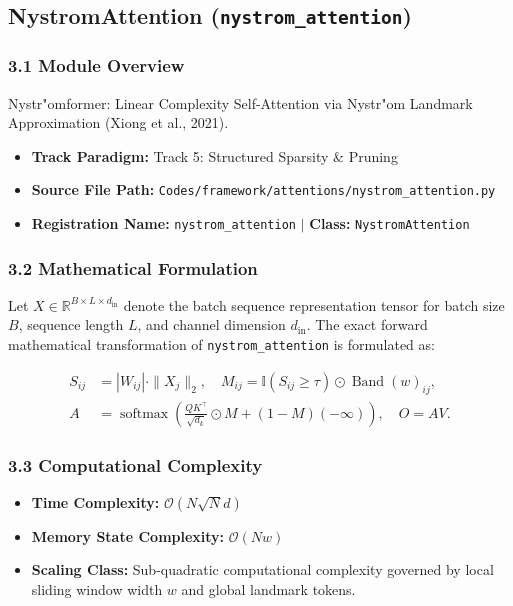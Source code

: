 \subsection{NystromAttention (\texttt{nystrom\_attention})}
\label{sec:app_module_nystrom_attention}

\subsubsection*{3.1 Module Overview}
Nystr"{o}mformer: Linear Complexity Self-Attention via Nystr"{o}m Landmark Approximation (Xiong et al., 2021).
\begin{itemize}
    \item \textbf{Track Paradigm:} Track 5: Structured Sparsity \& Pruning
    \item \textbf{Source File Path:} \texttt{Codes/framework/attentions/nystrom\_attention.py}
    \item \textbf{Registration Name:} \texttt{nystrom\_attention} $\mid$ \textbf{Class:} \texttt{NystromAttention}
\end{itemize}

\subsubsection*{3.2 Mathematical Formulation}
Let $X \in \mathbb{R}^{B \times L \times d_{\text{in}}}$ denote the batch sequence representation tensor for batch size $B$, sequence length $L$, and channel dimension $d_{\text{in}}$. The exact forward mathematical transformation of \texttt{nystrom\_attention} is formulated as:

\begin{align}
S_{ij} &= |W_{ij}| \cdot \|X_j\|_2, \quad M_{ij} = \mathbb{I}(S_{ij} \ge \tau) \odot \operatorname{Band}(w)_{ij}, \\
A &= \operatorname{softmax}\left(\frac{Q K^\top}{\sqrt{d_k}} \odot M + (1 - M)(-\infty)\right), \quad O = A V.
\end{align}


\subsubsection*{3.3 Computational Complexity}
\begin{itemize}
    \item \textbf{Time Complexity:} $\mathcal{O}(N \sqrt{N} d)$
    \item \textbf{Memory State Complexity:} $\mathcal{O}(N w)$
    \item \textbf{Scaling Class:} Sub-quadratic computational complexity governed by local sliding window width $w$ and global landmark tokens.
\end{itemize}

